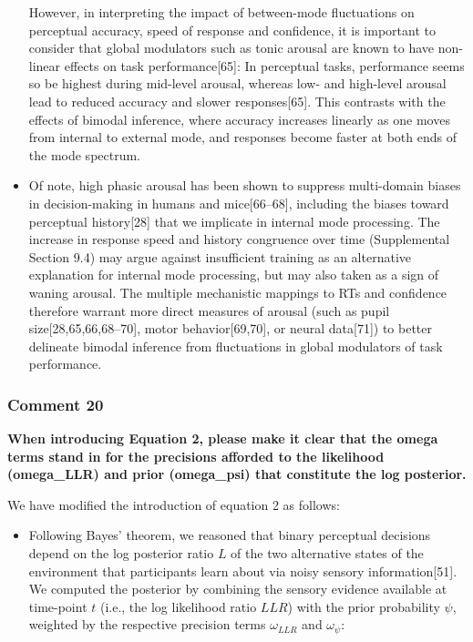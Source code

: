 \documentclass[
]{article}
\providecommand{\tightlist}{%
  \setlength{\itemsep}{0pt}\setlength{\parskip}{0pt}}
\begin{document}
\begin{itemize}
  However, in interpreting the impact of between-mode fluctuations on
  perceptual accuracy, speed of response and confidence, it is important
  to consider that global modulators such as tonic arousal are known to
  have non-linear effects on task performance{[}65{]}: In perceptual
  tasks, performance seems so be highest during mid-level arousal,
  whereas low- and high-level arousal lead to reduced accuracy and
  slower responses{[}65{]}. This contrasts with the effects of bimodal
  inference, where accuracy increases linearly as one moves from
  internal to external mode, and responses become faster at both ends of
  the mode spectrum.
\item
  Of note, high phasic arousal has been shown to suppress multi-domain
  biases in decision-making in humans and mice{[}66--68{]}, including
  the biases toward perceptual history{[}28{]} that we implicate in
  internal mode processing. The increase in response speed and history
  congruence over time (Supplemental Section 9.4) may argue against
  insufficient training as an alternative explanation for internal mode
  processing, but may also taken as a sign of waning arousal. The
  multiple mechanistic mappings to RTs and confidence therefore warrant
  more direct measures of arousal (such as pupil
  size{[}28,65,66,68--70{]}, motor behavior{[}69,70{]}, or neural
  data{[}71{]}) to better delineate bimodal inference from fluctuations
  in global modulators of task performance.
\end{itemize}

\hypertarget{comment-20}{%
\subsubsection{Comment 20}\label{comment-20}}

\textbf{When introducing Equation 2, please make it clear that the omega
terms stand in for the precisions afforded to the likelihood
(omega\_LLR) and prior (omega\_psi) that constitute the log posterior.}

We have modified the introduction of equation 2 as follows:

\begin{itemize}
\tightlist
\item
  Following Bayes' theorem, we reasoned that binary perceptual decisions
  depend on the log posterior ratio \(L\) of the two alternative states
  of the environment that participants learn about via noisy sensory
  information{[}51{]}. We computed the posterior by combining the
  sensory evidence available at time-point \(t\) (i.e., the log
  likelihood ratio \(LLR\)) with the prior probability \(\psi\),
  weighted by the respective precision terms \(\omega_{LLR}\) and
  \(\omega_{\psi}\):
\end{itemize}
\end{document}
